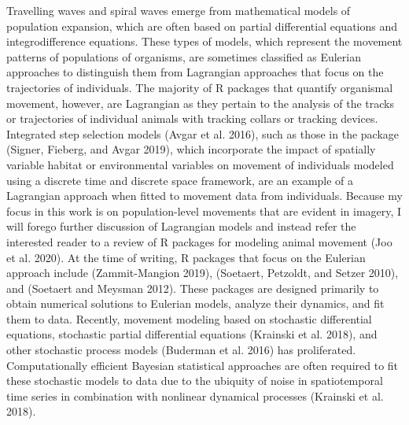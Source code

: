 Travelling waves and spiral waves emerge from mathematical models of population expansion, which are often based on partial differential equations and integrodifference equations. These types of models, which represent the movement patterns of populations of organisms, are sometimes classified as Eulerian approaches to distinguish them from Lagrangian approaches that focus on the trajectories of individuals. The majority of R packages that quantify organismal movement, however, are Lagrangian as they pertain to the analysis of the tracks or trajectories of individual animals with tracking collars or tracking devices. Integrated step selection models (Avgar et al. 2016), such as those in the  package (Signer, Fieberg, and Avgar 2019), which incorporate the impact of spatially variable habitat or environmental variables on movement of individuals modeled using a discrete time and discrete space framework, are an example of a Lagrangian approach when fitted to movement data from individuals. Because my focus in this work is on population-level movements that are evident in imagery, I will forego further discussion of Lagrangian models and instead refer the interested reader to a review of R packages for modeling animal movement (Joo et al. 2020). At the time of writing, R packages that focus on the Eulerian approach include  (Zammit-Mangion 2019),  (Soetaert, Petzoldt, and Setzer 2010), and  (Soetaert and Meysman 2012). These packages are designed primarily to obtain numerical solutions to Eulerian models, analyze their dynamics, and fit them to data. Recently, movement modeling based on stochastic differential equations, stochastic partial differential equations (Krainski et al. 2018), and other stochastic process models (Buderman et al. 2016) has proliferated. Computationally efficient Bayesian statistical approaches are often required to fit these stochastic models to data due to the ubiquity of noise in spatiotemporal time series in combination with nonlinear dynamical processes (Krainski et al. 2018).

